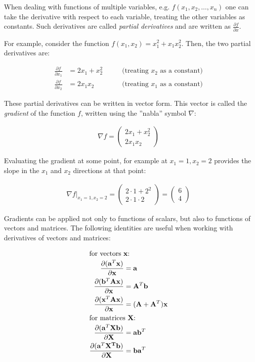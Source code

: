 When dealing with functions of multiple variables, e.g. $f(x_1, x_2, \ldots , x_n)$ one can take the derivative with respect to each variable, treating the other variables as constants. Such derivatives are called \emph{partial derivatives} and are written as $\frac{\partial f}{\partial x}$. 

For example, consider the function $f(x_1, x_2) = x_1^2 + x_1 x_2^2$. Then, the two partial derivatives are:

\begin{align*}
\frac{\partial f}{\partial x_1} &= 2 x_1 + x_2^2 \qquad &\text{(treating $x_2$ as a constant)} \\
\frac{\partial f}{\partial x_2} &= 2 x_1 x_2 \qquad &\text{(treating $x_1$ as a constant)}
\end{align*}

These partial derivatives can be written in vector form. This vector is called the \emph{gradient} of the function $f$, written using the ''nabla'' symbol $\nabla$:

\begin{align}
\nabla f = \begin{pmatrix}
2 x_1 + x_2^2 \\
2 x_1 x_2 \end{pmatrix} \label{eq:math:gradient}
\end{align}

Evaluating the gradient at some point, for example at $x_1=1, x_2=2$ provides the slope in the $x_1$ and $x_2$ directions at that point:

\begin{align*}
\nabla f \rvert_{x_1=1, x_2=2} = \begin{pmatrix}
2 \cdot 1 + 2^2 \\
2 \cdot 1 \cdot 2 \end{pmatrix} = \begin{pmatrix} 6 \\ 4 \end{pmatrix}
\end{align*}

Gradients can be applied not only to functions of scalars, but also to functions of vectors and matrices. The following identities are useful when working with derivatives of vectors and matrices:

\begin{align*}
\intertext{for vectors $\mathbf{x}$:}
\frac{\partial (\mathbf{a}^T\mathbf{x})}{\partial \mathbf{x}} &= \mathbf{a} \\ 
\frac{\partial (\mathbf{b}^T\mathbf{A} \mathbf{x})}{\partial \mathbf{x}} &= \mathbf{A}^T \mathbf{b} \\ 
\frac{\partial (\mathbf{x}^T\mathbf{A} \mathbf{x})}{\partial \mathbf{x}} &= (\mathbf{A} + \mathbf{A}^T) \mathbf{x} \\
\intertext{for matrices $\mathbf{X}$:}
\frac{\partial (\mathbf{a}^T\mathbf{X} \mathbf{b})}{\partial \mathbf{X}} &= \mathbf{a} \mathbf{b}^T \\
\frac{\partial (\mathbf{a}^T\mathbf{X^T} \mathbf{b})}{\partial \mathbf{X}} &= \mathbf{b} \mathbf{a}^T
\end{align*}


